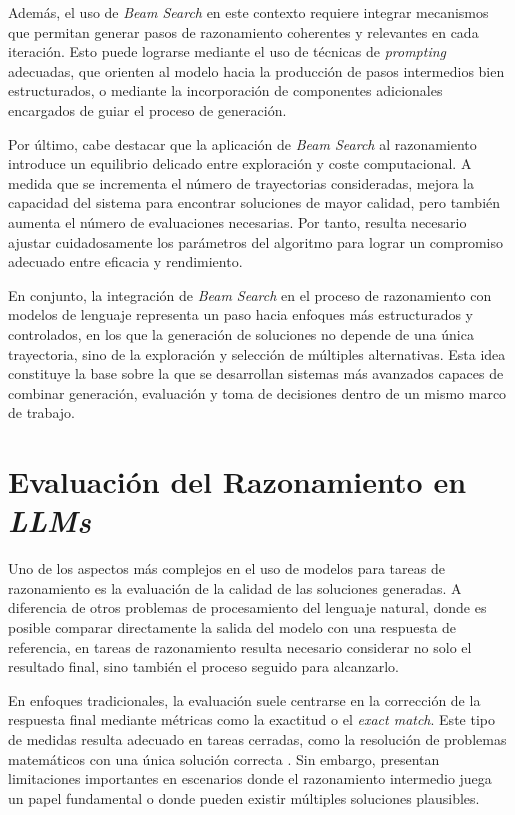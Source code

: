 \documentclass[12pt,a4paper,twoside,openright]{book}
\begin{document}
Además, el uso de \emph{Beam Search} en este contexto requiere integrar mecanismos que permitan generar pasos de razonamiento coherentes y relevantes en cada iteración. Esto puede lograrse mediante el uso de técnicas de \emph{prompting}
adecuadas, que orienten al modelo hacia la producción de pasos intermedios bien estructurados, o mediante la incorporación de componentes adicionales encargados de guiar el proceso de generación.

Por último, cabe destacar que la aplicación de \emph{Beam Search} al razonamiento introduce un equilibrio delicado entre exploración y coste computacional. A medida que se incrementa el número de trayectorias consideradas, mejora la capacidad
del sistema para encontrar soluciones de mayor calidad, pero también aumenta el número de evaluaciones necesarias. Por tanto, resulta necesario ajustar cuidadosamente los parámetros del algoritmo para lograr un compromiso adecuado entre
eficacia y rendimiento.

En conjunto, la integración de \emph{Beam Search} en el proceso de razonamiento con modelos de lenguaje representa un paso hacia enfoques más estructurados y controlados, en los que la generación de soluciones no depende de una única trayectoria,
sino de la exploración y selección de múltiples alternativas. Esta idea constituye la base sobre la que se desarrollan sistemas más avanzados capaces de combinar generación, evaluación y toma de decisiones dentro de un mismo marco de trabajo.


\section{Evaluación del Razonamiento en \emph{LLMs}}

Uno de los aspectos más complejos en el uso de modelos para tareas de razonamiento es la evaluación de la calidad de las soluciones generadas. A diferencia de otros problemas de procesamiento del lenguaje natural, donde es posible comparar
directamente la salida del modelo con una respuesta de referencia, en tareas de razonamiento resulta necesario considerar no solo el resultado final, sino también el proceso seguido para alcanzarlo.

En enfoques tradicionales, la evaluación suele centrarse en la corrección de la respuesta final mediante métricas como la exactitud o el \emph{exact match}. Este tipo de medidas resulta adecuado en tareas cerradas, como la resolución de problemas
matemáticos con una única solución correcta \cite{cobbe2021training}. Sin embargo, presentan limitaciones importantes en escenarios donde el razonamiento intermedio juega un papel fundamental o donde pueden existir múltiples soluciones plausibles.
\end{document}
